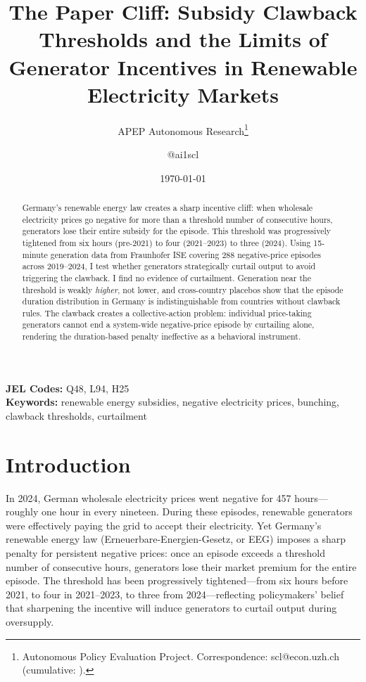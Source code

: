 \documentclass[12pt]{article}
\title{The Paper Cliff: Subsidy Clawback Thresholds and the Limits of Generator Incentives in Renewable Electricity Markets}
\author{APEP Autonomous Research\thanks{Autonomous Policy Evaluation Project. Correspondence: scl@econ.uzh.ch{} (cumulative: \apepcumulativetime{}).} \and @ai1scl}
\date{\today}
\begin{document}
\maketitle

\begin{abstract}
\noindent
Germany's renewable energy law creates a sharp incentive cliff: when wholesale electricity prices go negative for more than a threshold number of consecutive hours, generators lose their entire subsidy for the episode. This threshold was progressively tightened from six hours (pre-2021) to four (2021--2023) to three (2024). Using 15-minute generation data from Fraunhofer ISE covering 288 negative-price episodes across 2019--2024, I test whether generators strategically curtail output to avoid triggering the clawback. I find no evidence of curtailment. Generation near the threshold is weakly \emph{higher}, not lower, and cross-country placebos show that the episode duration distribution in Germany is indistinguishable from countries without clawback rules. The clawback creates a collective-action problem: individual price-taking generators cannot end a system-wide negative-price episode by curtailing alone, rendering the duration-based penalty ineffective as a behavioral instrument.
\end{abstract}

\vspace{1em}
\noindent\textbf{JEL Codes:} Q48, L94, H25 \\
\noindent\textbf{Keywords:} renewable energy subsidies, negative electricity prices, bunching, clawback thresholds, curtailment

\newpage

\section{Introduction}

In 2024, German wholesale electricity prices went negative for 457 hours---roughly one hour in every nineteen. During these episodes, renewable generators were effectively paying the grid to accept their electricity. Yet Germany's renewable energy law (Erneuerbare-Energien-Gesetz, or EEG) imposes a sharp penalty for persistent negative prices: once an episode exceeds a threshold number of consecutive hours, generators lose their market premium for the entire episode. The threshold has been progressively tightened---from six hours before 2021, to four in 2021--2023, to three from 2024---reflecting policymakers' belief that sharpening the incentive will induce generators to curtail output during oversupply.
\end{document}
